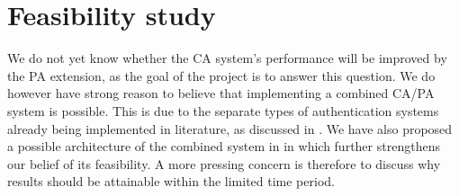 \documentclass[informationsecurity]{gucmasterproject}
\begin{document}
%
%
%
%
\chapter{Feasibility study}
We do not yet know whether the CA system's performance will be improved by the PA extension, as the goal of the project is to answer this question.
We do however have strong reason to believe that implementing a combined CA/PA system is possible.
This is due to the separate types of authentication systems already being implemented in literature, as discussed in .
We have also proposed a possible architecture of the combined system in  in  which further strengthens our belief of its feasibility.
A more pressing concern is therefore to discuss why results should be attainable within the limited time period.
\end{document}
